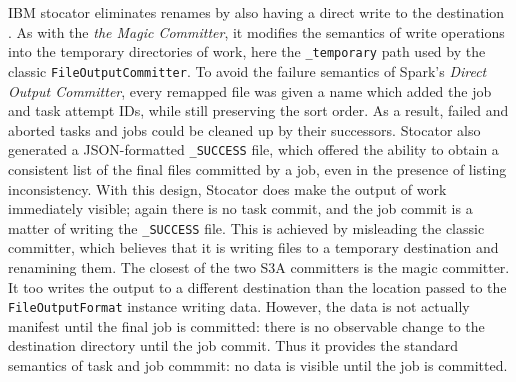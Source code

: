 \documentclass[9pt,technote]{IEEEtran}
\begin{document}
IBM stocator eliminates renames by also having a direct write to the destination  \cite{DBLP:journals/corr/abs-1709-01812}. As with the \emph{the Magic Committer}, it modifies the semantics of write operations into the temporary directories of work, here the \texttt{\_temporary} path used by the classic \texttt{FileOutputCommitter}.
To avoid the failure semantics of Spark's \emph{Direct Output Committer}, every remapped file was given a name which added the job and task attempt IDs, while still preserving the sort order. As a result, failed and aborted tasks and jobs could be cleaned up by their successors. Stocator also generated a JSON-formatted \texttt{\_SUCCESS} file, which offered the ability to obtain a consistent list of the final files committed by a job, even in the presence of listing inconsistency. With this design, Stocator does make the output of work immediately visible; again there is no task commit, and the job commit is a matter of writing the \texttt{\_SUCCESS} file. This is achieved by misleading the classic committer, which believes that it is writing files to a temporary destination and renamining them. The closest of the two S3A committers is the magic committer. It too writes the output to a different destination than the location passed to the \texttt{FileOutputFormat} instance writing data. However, the data is not actually manifest until the final job is committed: there is no observable change to the destination directory until the job commit. Thus it provides the standard semantics of task and job commmit: no data is visible until the job is committed.
\end{document}
